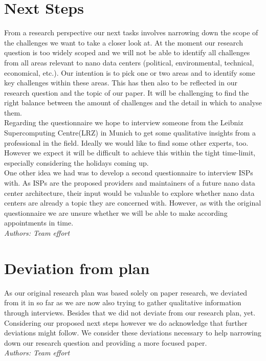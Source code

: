 \documentclass[sigchi-a, authorversion]{acmart}
\begin{document}
\section{Next Steps}
From a research perspective our next tasks involves narrowing down the scope of the challenges we want to take a closer look at. At the moment our research question is too widely scoped and we will not be able to identify all challenges from all areas relevant to nano data centers (political, environmental, technical, economical, etc.). Our intention is to pick one or two areas and to identify some key challenges within these areas. This has then also to be reflected in our research question and the topic of our paper. It will be challenging to find the right balance between the amount of challenges and the detail in which to analyse them.\\
Regarding the questionnaire we hope to interview someone from the Leibniz Supercomputing Centre(LRZ) in Munich to get some qualitative insights from a professional in the field. Ideally we would like to find some other experts, too. However we expect it will be difficult to achieve this within the tight time-limit, especially considering the holidays coming up.\\
One other idea we had was to develop a second questionnaire to interview ISPs with. As ISPs are the proposed providers and maintainers of a future nano data center architecture, their input would be valuable to explore whether nano data centers are already a topic they are concerned with. However, as with the original questionnaire we are unsure whether we will be able to make according appointments in time.\\
\textit{Authors: Team effort}\\

\section{Deviation from plan}
As our original research plan was based solely on paper research, we deviated from it in so far as we are now also trying to gather qualitative information through interviews. Besides that we did not deviate from our research plan, yet. Considering our proposed next steps however we do acknowledge that further deviations might follow. We consider these deviations necessary to help narrowing down our research question and providing a more focused paper.\\
\textit{Authors: Team effort}\\
\end{document}
